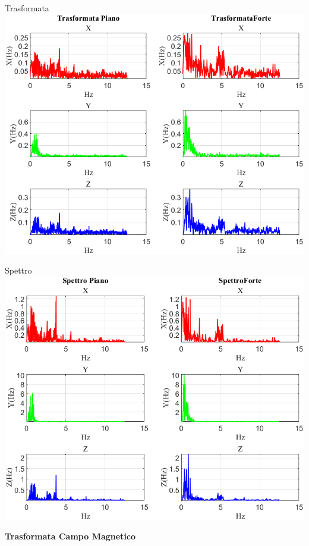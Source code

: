 	\begin{frame}{{Trasformata}}
		\centering\includegraphics[height=.8\textheight]{figure/Mag/Trasformata/Trasformata}
	\end{frame}
	
	\begin{frame}{{Spettro}}
		\centering\includegraphics[height=.8\textheight]{figure/Mag/Trasformata/Spettro}
	\end{frame}
	
	\begin{frame}
		\color{blue}\centering\huge{\textbf{Trasformata Campo Magnetico}}
	\end{frame}
	
